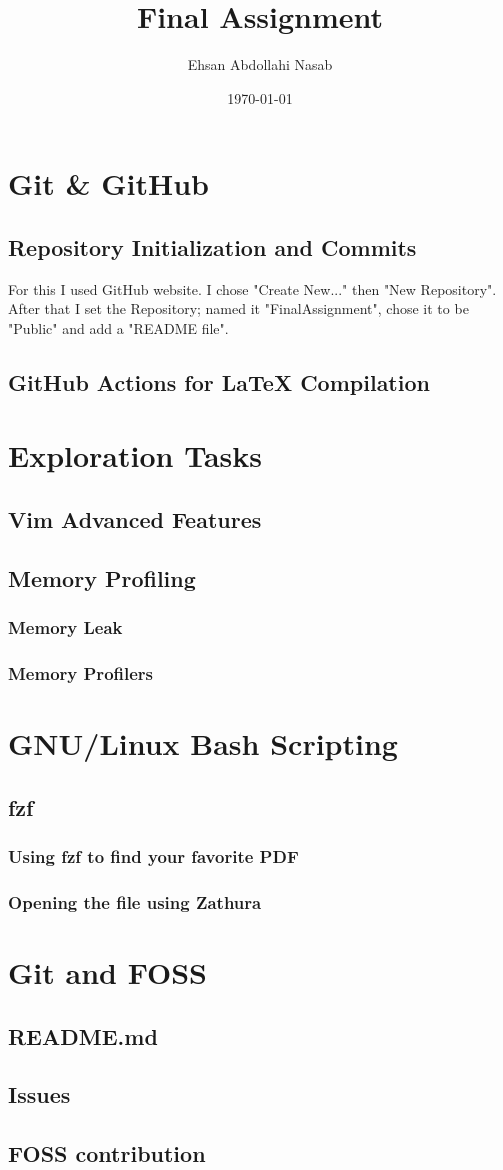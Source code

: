 \documentclass{article}
\title{Final Assignment}
\author{Ehsan Abdollahi Nasab}
\date{\today}
\begin{document}
\maketitle

\section{Git & GitHub}
\subsection{Repository Initialization and Commits}
For this I used GitHub website. I chose "Create New..." then "New Repository". After that I set the Repository; named it "FinalAssignment", chose it to be "Public" and add a "README file".

\subsection{GitHub Actions for LaTeX Compilation}

\section{Exploration Tasks}
\subsection{Vim Advanced Features}
\subsection{Memory Profiling}
\subsubsection{Memory Leak}
\subsubsection{Memory Profilers}

\section{GNU/Linux Bash Scripting}
\subsection{fzf}
\subsubsection{Using fzf to find your favorite PDF}
\subsubsection{Opening the file using Zathura}

\section{Git and FOSS}
\subsection{README.md}
\subsection{Issues}
\subsection{FOSS contribution}
\end{document}
